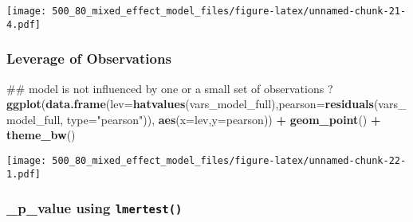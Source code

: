 \documentclass[]{article}
\newenvironment{Shaded}{\begin{snugshade}}{\end{snugshade}}
\newcommand{\KeywordTok}[1]{\textcolor[rgb]{0.13,0.29,0.53}{\textbf{#1}}}
\newcommand{\DataTypeTok}[1]{\textcolor[rgb]{0.13,0.29,0.53}{#1}}
\newcommand{\StringTok}[1]{\textcolor[rgb]{0.31,0.60,0.02}{#1}}
\newcommand{\CommentTok}[1]{\textcolor[rgb]{0.56,0.35,0.01}{\textit{#1}}}
\newcommand{\OperatorTok}[1]{\textcolor[rgb]{0.81,0.36,0.00}{\textbf{#1}}}
\newcommand{\NormalTok}[1]{#1}
\begin{document}
\texttt{[image: 500\_80\_mixed\_effect\_model\_files/figure-latex/unnamed-chunk-21-4.pdf]}

\subsubsection{Leverage of Observations}\label{leverage-of-observations}

\begin{Shaded}
\begin{Highlighting}[]
\NormalTok{## model is not influenced by one or a small set of observations ?}
\KeywordTok{ggplot}\NormalTok{(}\KeywordTok{data.frame}\NormalTok{(}\DataTypeTok{lev=}\KeywordTok{hatvalues}\NormalTok{(vars_model_full),}\DataTypeTok{pearson=}\KeywordTok{residuals}\NormalTok{(vars_model_full, }\DataTypeTok{type=}\StringTok{"pearson"}\NormalTok{)),}
      \KeywordTok{aes}\NormalTok{(}\DataTypeTok{x=}\NormalTok{lev,}\DataTypeTok{y=}\NormalTok{pearson)) }\OperatorTok{+}\StringTok{ }\KeywordTok{geom_point}\NormalTok{() }\OperatorTok{+}\StringTok{ }\KeywordTok{theme_bw}\NormalTok{()}
\end{Highlighting}
\end{Shaded}

\texttt{[image: 500\_80\_mixed\_effect\_model\_files/figure-latex/unnamed-chunk-22-1.pdf]}

\subsubsection{\texorpdfstring{\_p\_value using
\texttt{lmertest()}}{\_p\_value using lmertest()}}\label{p_value-using-lmertest}

\begin{Shaded}
\end{Shaded}
\end{document}
